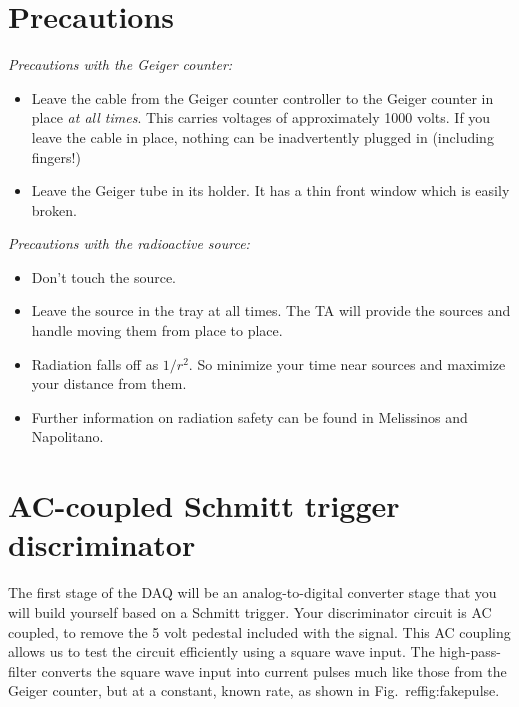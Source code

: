 \documentclass[12pt]{article}
\begin{document}
\section{Precautions}

\noindent
{\em Precautions with the Geiger counter:}
\begin{itemize}
\item Leave the cable from the Geiger counter controller to the Geiger counter in place {\em at all times}.  This carries voltages of approximately 1000 volts.  If you leave the cable in place, nothing can be inadvertently plugged in (including fingers!)
\item Leave the Geiger tube in its holder.  It has a thin front window which is easily broken.
\end{itemize}

\noindent
{\em Precautions with the radioactive source:}
\begin{itemize}
\item Don't touch the source.
\item Leave the source in the tray at all times.  The TA will provide the sources and handle moving them from place to place.
\item Radiation falls off as $1/r^2$.  So minimize your time near sources and maximize your distance from them.
\item Further information on radiation safety can be found in Melissinos and Napolitano.
\end{itemize}

\section{AC-coupled Schmitt trigger discriminator}

The first stage of the DAQ will be an analog-to-digital converter stage that you will build yourself based on a Schmitt trigger.  Your discriminator circuit is AC coupled, to remove the 5 volt pedestal included with the signal.  This AC coupling allows us to test the circuit efficiently using a square wave input.  The high-pass-filter converts the square wave input into current pulses much like those from the Geiger counter, but at a constant, known rate, as shown in Fig.~ref{fig:fakepulse}.
\end{document}
